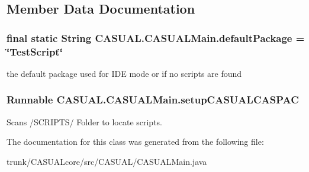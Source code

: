 \subsection{Member Data Documentation}
\hypertarget{classCASUAL_1_1CASUALMain_a388333cdd95aadbbee46efc43efea098}{
\subsubsection[{default\-Package}]{\setlength{\rightskip}{0pt plus 5cm}final static String C\-A\-S\-U\-A\-L.\-C\-A\-S\-U\-A\-L\-Main.\-default\-Package = \char`\"{}Test\-Script\char`\"{}\hspace{0.3cm}{\ttfamily [static]}}}\label{classCASUAL_1_1CASUALMain_a388333cdd95aadbbee46efc43efea098}
the default package used for I\-D\-E mode or if no scripts are found \hypertarget{classCASUAL_1_1CASUALMain_ac0104001f09bb1d16dea21e6146abb76}{
\subsubsection[{setup\-C\-A\-S\-U\-A\-L\-C\-A\-S\-P\-A\-C}]{\setlength{\rightskip}{0pt plus 5cm}Runnable C\-A\-S\-U\-A\-L.\-C\-A\-S\-U\-A\-L\-Main.\-setup\-C\-A\-S\-U\-A\-L\-C\-A\-S\-P\-A\-C}}\label{classCASUAL_1_1CASUALMain_ac0104001f09bb1d16dea21e6146abb76}
Scans /\-S\-C\-R\-I\-P\-T\-S/ Folder to locate scripts. 

The documentation for this class was generated from the following file\-:\begin{DoxyCompactItemize}
\item 
trunk/\-C\-A\-S\-U\-A\-Lcore/src/\-C\-A\-S\-U\-A\-L/C\-A\-S\-U\-A\-L\-Main.\-java\end{DoxyCompactItemize}
